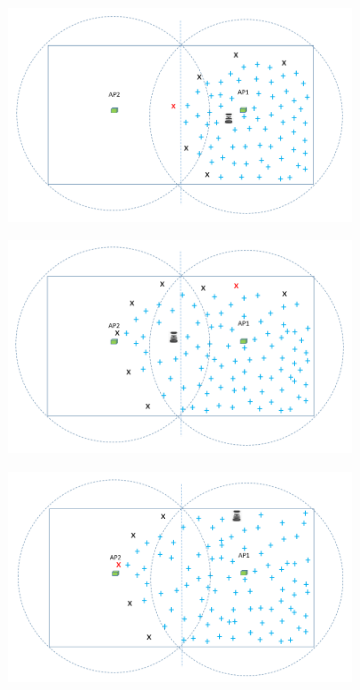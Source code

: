 \begin{figure}
\begin{subfigure}[b]{0.495\textwidth}
		\label{subfig:c} 
		\caption{}
	\end{subfigure}
	\begin{subfigure}[b]{0.495\textwidth}
		\includegraphics[width=\textwidth, height=0.6\textwidth]{images/w4.png}
		\label{subfig:d}
		\caption{}
	\end{subfigure}
    \begin{subfigure}[b]{0.495\textwidth}
		\includegraphics[width=\textwidth, height=0.6\textwidth]{images/w5.png}
		\label{subfig:e} 
		\caption{}
	\end{subfigure}
	\begin{subfigure}[b]{0.495\textwidth}
		\includegraphics[width=\textwidth, height=0.6\textwidth]{images/w6.png}

\end{subfigure}
\end{figure}
